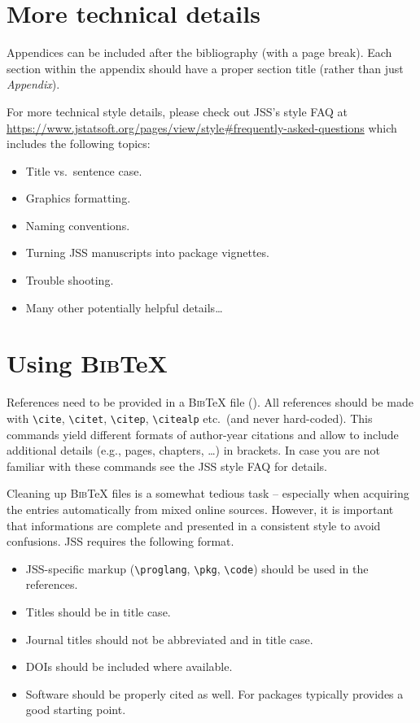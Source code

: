 \documentclass[article]{jss}
\begin{document}
\begin{appendix}
\section{More technical details} \label{app:technical}

\begin{leftbar}
Appendices can be included after the bibliography (with a page break). Each
section within the appendix should have a proper section title (rather than
just \emph{Appendix}).

For more technical style details, please check out JSS's style FAQ at
\url{https://www.jstatsoft.org/pages/view/style#frequently-asked-questions}
which includes the following topics:
\begin{itemize}
  \item Title vs.\ sentence case.
  \item Graphics formatting.
  \item Naming conventions.
  \item Turning JSS manuscripts into  package vignettes.
  \item Trouble shooting.
  \item Many other potentially helpful details\dots
\end{itemize}
\end{leftbar}


\section[Using BibTeX]{Using \textsc{Bib}{\TeX}} \label{app:bibtex}

\begin{leftbar}
References need to be provided in a \textsc{Bib}{\TeX} file (). All
references should be made with \verb|\cite|, \verb|\citet|, \verb|\citep|,
\verb|\citealp| etc.\ (and never hard-coded). This commands yield different
formats of author-year citations and allow to include additional details (e.g.,
pages, chapters, \dots) in brackets. In case you are not familiar with these
commands see the JSS style FAQ for details.

Cleaning up \textsc{Bib}{\TeX} files is a somewhat tedious task -- especially
when acquiring the entries automatically from mixed online sources. However,
it is important that informations are complete and presented in a consistent
style to avoid confusions. JSS requires the following format.
\begin{itemize}
  \item JSS-specific markup (\verb|\proglang|, \verb|\pkg|, \verb|\code|) should
    be used in the references.
  \item Titles should be in title case.
  \item Journal titles should not be abbreviated and in title case.
  \item DOIs should be included where available.
  \item Software should be properly cited as well. For  packages
     typically provides a good starting point.
\end{itemize}
\end{leftbar}

\end{appendix}

\end{document}
